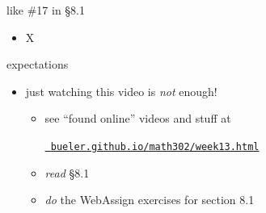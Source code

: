 \documentclass[urlcolor=blue,dvipsnames]{beamer}
\begin{document}
\begin{frame}{like \#17 in \S8.1}

\begin{itemize}
\item X
\end{itemize}
\end{frame}


\begin{frame}{expectations}

\begin{itemize}
\item just watching this video is \emph{not} enough!
     \begin{itemize}
     \item see ``found online'' videos and stuff at

     \centerline{\href{https://bueler.github.io/math302/week13.html}{\tt \color{cyan} bueler.github.io/math302/week13.html}}
     \item \emph{read} \S8.1
     \item \emph{do} the WebAssign exercises for section 8.1
     \end{itemize}
\end{itemize}
\end{frame}
\end{document}
